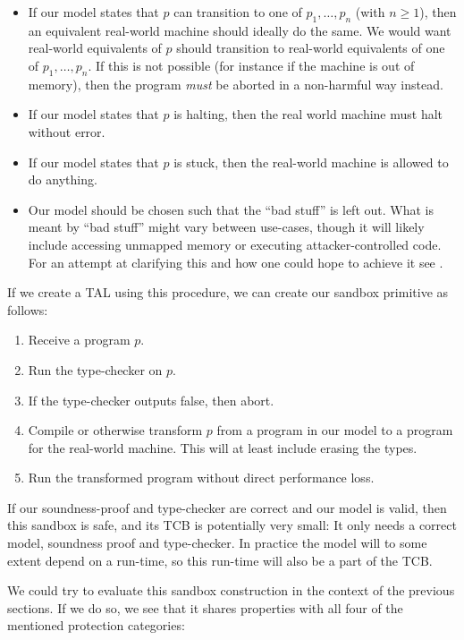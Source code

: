 \begin{itemize}
\item If our model states that $p$ can transition to one of $p_1, \dots, p_n$
  (with $n \geq 1$), then an equivalent real-world machine should ideally do the
  same. We would want real-world equivalents of $p$ should transition to
  real-world equivalents of one of $p_1, \dots, p_n$. If this is not possible
  (for instance if the machine is out of memory), then the program \emph{must}
  be aborted in a non-harmful way instead.
\item If our model states that $p$ is halting, then the real world machine
  must halt without error.
\item If our model states that $p$ is stuck, then the real-world machine is
  allowed to do anything.
\item Our model should be chosen such that the ``bad stuff'' is left out. What
  is meant by ``bad stuff'' might vary between use-cases, though it will likely
  include accessing unmapped memory or executing attacker-controlled code. For
  an attempt at clarifying this and how one could hope to achieve it see
  .
\end{itemize}

If we create a TAL using this procedure, we can create our sandbox primitive as
follows:

\begin{enumerate}
\item Receive a program $p$.
\item Run the type-checker on $p$.
\item If the type-checker outputs false, then abort.
\item Compile or otherwise transform $p$ from a program in our model to a
  program for the real-world machine. This will at least include erasing the
  types.
\item Run the transformed program without direct performance loss.
\end{enumerate}

If our soundness-proof and type-checker are correct and our model is valid, then
this sandbox is safe, and its TCB is potentially very small: It only needs a
correct model, soundness proof and type-checker. In practice the model will to
some extent depend on a run-time, so this run-time will also be a part of the
TCB.

We could try to evaluate this sandbox construction in the context of the
previous sections. If we do so, we see that it shares properties with all four
of the mentioned protection categories:

